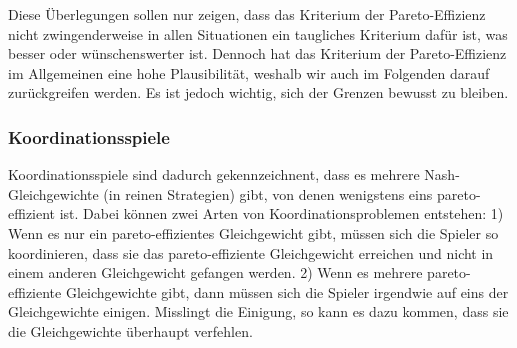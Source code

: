 Diese Überlegungen sollen nur zeigen, dass das Kriterium der Pareto-Effizienz
nicht zwingenderweise in allen Situationen ein taugliches Kriterium dafür ist,
was besser oder wünschenswerter ist. Dennoch hat das Kriterium der
Pareto-Effizienz im Allgemeinen eine hohe Plausibilität, weshalb wir auch im
Folgenden darauf zurückgreifen werden. Es ist jedoch wichtig, sich der Grenzen
bewusst zu bleiben.


\subsubsection{Koordinationsspiele}

Koordinationsspiele sind dadurch gekennzeichnent, dass es mehrere
Nash-Gleichgewichte (in reinen Strategien) gibt, von denen wenigstens eins
pareto-effizient ist. Dabei können zwei Arten von Koordinationsproblemen
entstehen: 1) Wenn es nur ein pareto-effizientes Gleichgewicht gibt, müssen
sich die Spieler so koordinieren, dass sie das pareto-effiziente Gleichgewicht
erreichen und nicht in einem anderen Gleichgewicht gefangen werden. 2) Wenn es
mehrere pareto-effiziente Gleichgewichte gibt, dann müssen sich die Spieler
irgendwie auf eins der Gleichgewichte einigen. Misslingt die Einigung, so kann
es dazu kommen, dass sie die Gleichgewichte überhaupt verfehlen.

